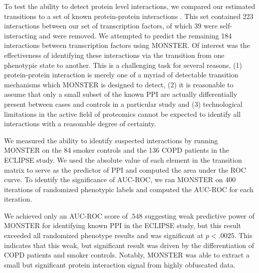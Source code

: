 \documentclass[9pt,twocolumn,twoside]{pnas-new}
\begin{document}
To test the ability to detect protein level interactions, we compared
our estimated transitions to a set of known protein-protein interactions
\cite{ravasi2010atlas}. This set contained 223 interactions between
our set of transcription factors, of which 39 were self-interacting
and were removed. We attempted to predict the remaining 184 interactions
between transcription factors using MONSTER. Of interest was the effectiveness
of identifying these interactions via the transition from one phenotypic
state to another. This is a challenging task for several reasons,
(1) protein-protein interaction is merely one of a myriad of detectable
transition mechanisms which MONSTER is designed to detect, (2) it
is reasonable to assume that only a small subset of the known PPI
are actually differentially present between cases and controls in
a particular study and (3) technological limitations in the active
field of proteomics cannot be expected to identify all interactions
with a reasonable degree of certainty.

We measured the ability to identify suspected interactions by running
MONSTER on the 84 smoker controls and the 136 COPD patients in the
ECLIPSE study. We used the absolute value of each element in the transition
matrix to serve as the predictor of PPI and computed the area under
the ROC curve. To identify the significance of AUC-ROC, we ran MONSTER
on 400 iterations of randomized phenotypic labels and computed the
AUC-ROC for each iteration. 

We achieved only an AUC-ROC score of $.548$ suggesting weak predictive
power of MONSTER for identifying known PPI in the ECLIPSE study, but
this result exceeded all randomized phenotype results and was significant
at $p<.0025$. This indicates that this weak, but significant result
was driven by the differentiation of COPD patients and smoker controls.
Notably, MONSTER was able to extract a small but significant protein
interaction signal from highly obfuscated data.
\end{document}
